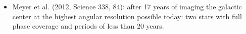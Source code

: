 \documentclass[letterpaper,landscape]{slides}
\begin{document}
\begin{slide}
{\begin{minipage}[t]{15cm}
\begin{itemize}
\item Meyer et al. (2012, Science 338, 84): after 17 years of imaging the galactic center at the highest angular 
resolution possible today: two stars with full phase coverage and periods of less than 20 years. 
\end{itemize}
\vskip 0.1in

\end{minipage}}
\vfill 
\end{slide}
\end{document}
